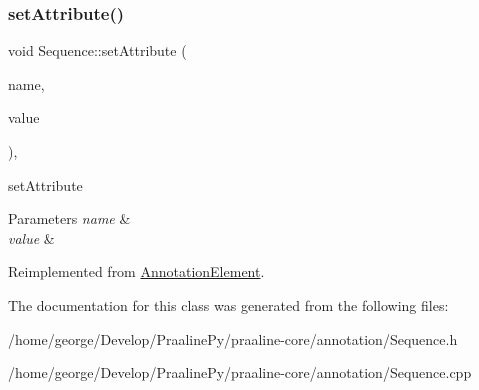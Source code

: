 \mbox{\label{class_sequence_a0c573124c566aa3a28c63fb362f58c6b}} 
\subsubsection{\texorpdfstring{set\+Attribute()}{setAttribute()}}
{\footnotesize\ttfamily void Sequence\+::set\+Attribute (\begin{DoxyParamCaption}\item[{const Q\+String \&}]{name,  }\item[{Q\+Variant}]{value }\end{DoxyParamCaption})\hspace{0.3cm}{\ttfamily [override]}, {\ttfamily [virtual]}}



set\+Attribute 


\begin{DoxyParams}{Parameters}
{\em name} & \\
\hline
{\em value} & \\
\hline
\end{DoxyParams}


Reimplemented from \hyperlink{class_annotation_element_a206d8790fe92a7c8e6b703d026836584}{Annotation\+Element}.



The documentation for this class was generated from the following files\+:\begin{DoxyCompactItemize}
\item 
/home/george/\+Develop/\+Praaline\+Py/praaline-\/core/annotation/Sequence.\+h\item 
/home/george/\+Develop/\+Praaline\+Py/praaline-\/core/annotation/Sequence.\+cpp\end{DoxyCompactItemize}
